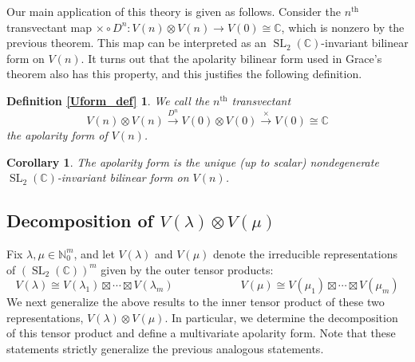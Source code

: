 \documentclass{article}
\newtheorem{corollary}[theorem]{Corollary}
\theoremstyle{definition}
\theoremstyle{plain}
\newcommand{\C}{\mathbb{C}}
\newcommand{\N}{\mathbb{N}}
\DeclareMathOperator{\SL}{SL}
\begin{document}
Our main application of this theory is given as follows. Consider the $n^\text{th}$ transvectant map $\times \circ D^n: V(n) \otimes V(n) \rightarrow V(0) \cong \C$, which is nonzero by the previous theorem. This map can be interpreted as an $\SL_2(\C)$-invariant bilinear form on $V(n)$. It turns out that the apolarity bilinear form used in Grace's theorem also has this property, and this justifies the following definition.

\newtheorem*{Uform_def}{Definition \ref{Uform_def}}
\begin{Uform_def}
    We call the $n^\text{th}$ transvectant
    \[
        V(n) \otimes V(n) \xrightarrow{D^n} V(0) \otimes V(0) \xrightarrow{\times} V(0) \cong \C
    \]
    the \emph{apolarity form} of $V(n)$.
\end{Uform_def}

\begin{corollary}\label{Uunique_cor}
    The apolarity form is the unique (up to scalar) nondegenerate $\SL_2(\C)$-invariant bilinear form on $V(n)$.
\end{corollary}

\subsection{Decomposition of \texorpdfstring{$V(\lambda) \otimes V(\mu)$}{V(lambda) tensor V(mu)}}

Fix $\lambda,\mu \in \N_0^m$, and let $V(\lambda)$ and $V(\mu)$ denote the irreducible representations of $(\SL_2(\C))^m$ given by the outer tensor products:
\[
    V(\lambda) \cong V(\lambda_1) \boxtimes \cdots \boxtimes V(\lambda_m)
    \qquad\qquad\qquad
    V(\mu) \cong V(\mu_1) \boxtimes \cdots \boxtimes V(\mu_m)
\]
We next generalize the above results to the inner tensor product of these two representations, $V(\lambda) \otimes V(\mu)$. In particular, we determine the decomposition of this tensor product and define a multivariate apolarity form. Note that these statements strictly generalize the previous analogous statements.
\end{document}
